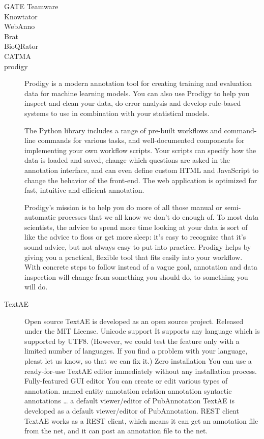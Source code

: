   \begin{description}
    \item[GATE Teamware]
    \item[Knowtator]
    \item[WebAnno]
    \item[Brat]
    \item[BioQRator]
    \item[CATMA]
    \item[prodigy]

    Prodigy is a modern annotation tool for creating training and evaluation data for machine learning models. You can also use Prodigy to help you inspect and clean your data, do error analysis and develop rule-based systems to use in combination with your statistical models.

    The Python library includes a range of pre-built workflows and command-line commands for various tasks, and well-documented components for implementing your own workflow scripts. Your scripts can specify how the data is loaded and saved, change which questions are asked in the annotation interface, and can even define custom HTML and JavaScript to change the behavior of the front-end. The web application is optimized for fast, intuitive and efficient annotation.

    Prodigy’s mission is to help you do more of all those manual or semi-automatic processes that we all know we don’t do enough of. To most data scientists, the advice to spend more time looking at your data is sort of like the advice to floss or get more sleep: it’s easy to recognize that it’s sound advice, but not always easy to put into practice. Prodigy helps by giving you a practical, flexible tool that fits easily into your workflow. With concrete steps to follow instead of a vague goal, annotation and data inspection will change from something you should do, to something you will do.

    \item[TextAE]

    Open source
    TextAE is developed as an open source project.
    Released under the MIT License.
     Unicode support
    It supports any language which is supported by UTF8.
    (However, we could test the feature only with a limited number of languages. If you find a problem with your language, pleast let us know, so that we can fix it.)
     Zero installation
    You can use a ready-for-use TextAE editor immediately without any installation process.
     Fully-featured GUI editor
    You can create or edit various types of annotation.
    named entity annotation
    relation annotation
    syntactic annotations
    …
     a default viewer/editor of PubAnnotation
    TextAE is developed as a default viewer/editor of PubAnnotation.
     REST client
    TextAE works as a REST client, which means
    it can get an annotation file from the net, and
    it can post an annotation file to the net.


\end{description}
